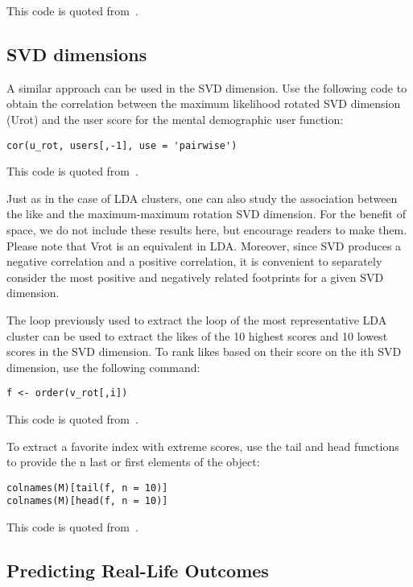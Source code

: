 This code is quoted from~\cite{editor12}.

\subsection{SVD dimensions}

A similar approach can be used in the SVD dimension. Use the 
following code to obtain the correlation between the maximum 
likelihood rotated SVD dimension (Urot) and the user score for the
 mental demographic user function:

\begin{verbatim}
cor(u_rot, users[,-1], use = 'pairwise')
\end{verbatim}

This code is quoted from~\cite{editor12}.

Just as in the case of LDA clusters, one can also study the 
association between the like and the maximum-maximum rotation SVD 
dimension. For the benefit of space, we do not include these 
results here, but encourage readers to make them. Please note that
 Vrot is an equivalent in LDA. Moreover, since SVD produces a 
negative correlation and a positive correlation, it is convenient 
to separately consider the most positive and negatively related 
footprints for a given SVD dimension.

The loop previously used to extract the loop of the most 
representative LDA cluster can be used to extract the likes of the
 10 highest scores and 10 lowest scores in the SVD dimension. To 
rank likes based on their score on the ith SVD dimension, use the 
following command:

\begin{verbatim}
f <- order(v_rot[,i])
\end{verbatim}

This code is quoted from~\cite{editor12}.

To extract a favorite index with extreme scores, use the tail and 
head functions to provide the n last or first elements of the 
object:

\begin{verbatim}
colnames(M)[tail(f, n = 10)]
colnames(M)[head(f, n = 10)]
\end{verbatim}

This code is quoted from~\cite{editor12}.


\subsection{Predicting Real-Life Outcomes}

